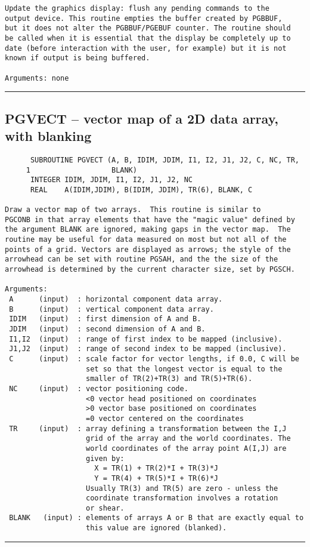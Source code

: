 {\begin{verbatim}
Update the graphics display: flush any pending commands to the
output device. This routine empties the buffer created by PGBBUF,
but it does not alter the PGBBUF/PGEBUF counter. The routine should
be called when it is essential that the display be completely up to
date (before interaction with the user, for example) but it is not
known if output is being buffered.

Arguments: none
\end{verbatim}
\hrule


\subsection*{PGVECT -- vector map of a 2D data array, with blanking }
\begin{verbatim}
      SUBROUTINE PGVECT (A, B, IDIM, JDIM, I1, I2, J1, J2, C, NC, TR,
     1                   BLANK)
      INTEGER IDIM, JDIM, I1, I2, J1, J2, NC
      REAL    A(IDIM,JDIM), B(IDIM, JDIM), TR(6), BLANK, C

Draw a vector map of two arrays.  This routine is similar to
PGCONB in that array elements that have the "magic value" defined by
the argument BLANK are ignored, making gaps in the vector map.  The
routine may be useful for data measured on most but not all of the
points of a grid. Vectors are displayed as arrows; the style of the
arrowhead can be set with routine PGSAH, and the the size of the
arrowhead is determined by the current character size, set by PGSCH.

Arguments:
 A      (input)  : horizontal component data array.
 B      (input)  : vertical component data array.
 IDIM   (input)  : first dimension of A and B.
 JDIM   (input)  : second dimension of A and B.
 I1,I2  (input)  : range of first index to be mapped (inclusive).
 J1,J2  (input)  : range of second index to be mapped (inclusive).
 C      (input)  : scale factor for vector lengths, if 0.0, C will be
                   set so that the longest vector is equal to the
                   smaller of TR(2)+TR(3) and TR(5)+TR(6).
 NC     (input)  : vector positioning code.
                   <0 vector head positioned on coordinates
                   >0 vector base positioned on coordinates
                   =0 vector centered on the coordinates
 TR     (input)  : array defining a transformation between the I,J
                   grid of the array and the world coordinates. The
                   world coordinates of the array point A(I,J) are
                   given by:
                     X = TR(1) + TR(2)*I + TR(3)*J
                     Y = TR(4) + TR(5)*I + TR(6)*J
                   Usually TR(3) and TR(5) are zero - unless the
                   coordinate transformation involves a rotation
                   or shear.
 BLANK   (input) : elements of arrays A or B that are exactly equal to
                   this value are ignored (blanked).
\end{verbatim}
\hrule


}
